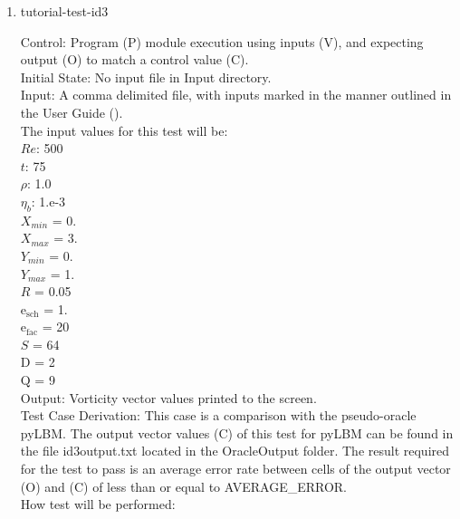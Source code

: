 \documentclass[12pt, titlepage]{article}
\begin{document}
\begin{enumerate}

\item{tutorial-test-id3\\}

Control: Program (P) module execution using inputs (V), and expecting output (O) to match a control value (C).\\
					
Initial State: No input file in Input directory.\\
					
Input: A comma delimited file, with inputs marked in the manner outlined in the User Guide (\citet{LBM_UserGuide_PM}).\\The input values for this test will be:\\
$Re$: 500\\
$t$: 75\\
$\rho$: 1.0\\
$\eta_b$: 1.e-3\\
$X_{min}$ = 0.\\
$X_{max}$ = 3.\\
$Y_{min}$ = 0.\\
$Y_{max}$ = 1.\\
$R$ = 0.05\\
$\mathrm{e_{sch}}$ = 1.\\
$\mathrm{e_{fac}}$ = 20\\
$S$ = 64\\
$\mathrm{D}$ = 2\\
$\mathrm{Q}$ = 9\\

		
Output: Vorticity vector values printed to the screen. \\

Test Case Derivation: This case is a comparison with the pseudo-oracle pyLBM. The output vector values (C) of this test for pyLBM can be found in the file id3output.txt located in the OracleOutput folder. The result required for the test to pass is an average error rate between cells of the output vector (O) and (C) of less than or equal to AVERAGE\_ERROR.\\


How test will be performed: 


\end{enumerate}
\end{document}
